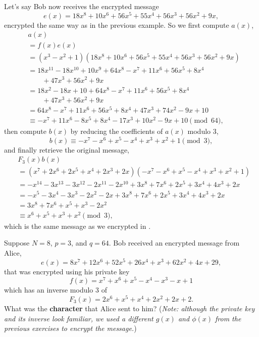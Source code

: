 \begin{example}
    Let's say Bob now receives the encrypted message
    \[
        e(x) = 18x^8 + 10x^6 + 56x^5 + 55x^4 + 56x^3 + 56x^2 + 9x,
    \]
    encrypted the same way as in the previous example. So we first compute $a(x)$,
    \begin{align*}
        &a(x)\\
        &= f(x)e(x)\\
        &= (x^3 - x^2 + 1)(18x^8 + 10x^6 + 56x^5 + 55x^4 + 56x^3 + 56x^2 + 9x)\\
        &= 18x^{11} - 18x^{10} + 10x^9 + 64x^8 - x^7 + 11x^6 + 56x^5 + 8x^4\\
        &\quad\quad+ 47x^3 + 56x^2 + 9x\\
        &= 18x^2 - 18x + 10 + 64x^8 - x^7 + 11x^6 + 56x^5 + 8x^4\\
        &\quad\quad+ 47x^3 + 56x^2 + 9x\\
        &= 64x^8 - x^7 + 11x^6 + 56x^5 + 8x^4 + 47x^3 + 74x^2 - 9x + 10\\
        &\equiv -x^7 + 11x^6 - 8x^5 + 8x^4 - 17x^3 + 10x^2 - 9x + 10 \pmod{64},
    \end{align*}
    then compute $b(x)$ by reducing the coefficients of $a(x)$ modulo 3,
    \[
        b(x) \equiv -x^7 - x^6 + x^5 - x^4 + x^3 + x^2 + 1 \pmod{3},
    \]
    and finally retrieve the original message,
    \begin{align*}
        &F_3(x)b(x)\\
        &= (x^7 + 2x^6 + 2x^5 +x^4 + 2x^3 + 2x)(-x^7 - x^6 + x^5 - x^4 + x^3 + x^2 + 1)\\
        &= -x^{14} - 3x^{13} - 3x^{12} - 2x^{11} - 2x^{10} + 3x^8 + 7x^6 + 2x^5 + 3x^4 + 4x^3 + 2x\\
        &= -x^5 - 3x^4 - 3x^3 - 2x^2 - 2x + 3x^8 + 7x^6 + 2x^5 + 3x^4 + 4x^3 + 2x\\
        &= 3x^8 + 7x^6 + x^5 + x^3 - 2x^2\\
        &\equiv x^6 + x^5 + x^3 + x^2 \pmod{3},
    \end{align*}
    which is the same message as we encrypted in .
\end{example}

\newpage

\begin{exercise}
    Suppose $N = 8$, $p = 3$, and $q = 64$. Bob received an encrypted message from Alice,
    \[
        e(x) = 8x^7 + 12x^6 + 52x^5 + 26x^4 +x^3 + 62x^2 + 4x + 29,
    \]
    that was encrypted using his private key
    \[
        f(x) = x^7 +x^6 +x^5 -x^4 -x^3 -x + 1
    \]
    which has an inverse modulo 3 of
    \[
        F_3(x) = 2x^6 +x^5 +x^4 + 2x^2 + 2x + 2.
    \]
    What was the \textbf{character} that Alice sent to him?\newline
    (\textit{Note: although the private key and its inverse look familiar, we used a different $g(x)$ and $\phi(x)$ from the previous exercises to encrypt the message.})
\end{exercise}

